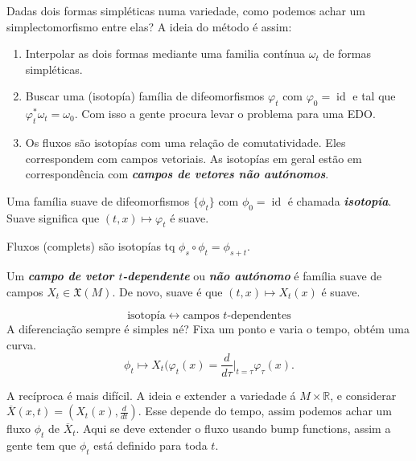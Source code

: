 Dadas dois formas simpl\'eticas numa variedade, como podemos achar um simplectomorfismo entre elas? A ideia do m\'etodo \'e assim:

\begin{enumerate}[label=\textbf{Step \arabic*}]
	\item Interpolar as dois formas mediante uma familia cont\'inua $\omega_t$ de formas simpl\'eticas.

	\item Buscar uma (isotop\'ia) fam\'ilia de difeomorfismos $\varphi_t$ com $\varphi_0=\operatorname{id}$ e tal que $\varphi^*_t\omega_t=\omega_0$. Com isso a gente procura levar o problema para uma EDO.

	\item Os fluxos s\~ao isotop\'ias com uma rela\c c\~ao de comutatividade. Eles correspondem com campos vetoriais. As isotop\'ias em geral est\~ao em correspond\^encia com \textit{\textbf{campos de vetores n\~ao aut\'onomos}}.
\end{enumerate}

\begin{defn}
	Uma fam\'ilia suave de difeomorfismos $\{\phi_t\}$ com $\phi_0=\operatorname{id}$ \'e chamada \textit{\textbf{isotop\'ia}}. Suave significa que $(t,x)\mapsto \varphi_t$ \'e suave.
\end{defn}

\begin{example}
	Fluxos (complets) s\~ao isotop\'ias tq $\phi_s\circ \phi_t=\phi_{s+t}$.
\end{example}

\begin{defn}
	Um \textit{\textbf{campo de vetor $t$-dependente}} ou  \textit{\textbf{n\~ao aut\'onomo}} \'e fam\'ilia suave de campos $X_t\in\mathfrak{X}(M)$. De novo, suave \'e que $(t,x)\mapsto X_t(x)$ \'e suave.
\end{defn}

\[\text{isotop\'ia} \leftrightarrow \text{campos $t$-dependentes}  \]
A diferencia\c c\~ao sempre \'e simples n\'e? Fixa um ponto e varia o tempo, obt\'em uma curva.
\[\phi_t\mapsto X_t(\varphi_t(x)=\frac{d}{d\tau}|_{t=\tau}\varphi_\tau(x).\]

A rec\'iproca \'e mais dif\'icil. A ideia e extender a variedade  \'a $M\times \mathbb{R}$, e considerar $\overline{X}(x,t)=(X_t(x),\frac{d}{dt})$. Esse depende do tempo, assim podemos achar um fluxo $\phi_t$ de $\overline{X}_t$. Aqui se deve extender o fluxo usando bump functions, assim a gente tem que $\phi_t$ est\'a definido para toda $t$.

